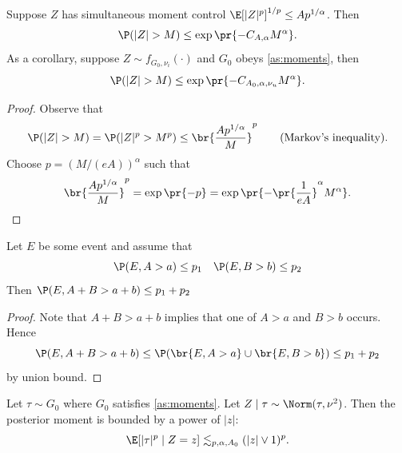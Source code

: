 \documentclass[12pt, reqno]{amsart}
\numberwithin{equation}{section}
\begin{document}
\begin{refsection}
\begin{appendices}
\begin{lemma}
\label{lemma:tail_bound}
Suppose $Z$ has simultaneous moment control $\E[|Z|^p]^{1/p} \le A p^{1/\alpha}$. Then \[
\P(|Z| > M) \le \exp\pr{-C_{A,\alpha} M^\alpha}.
\]
As a corollary, suppose $ Z \sim f_{G_0, \nu_i}(\cdot)$ and $G_0$ obeys \cref{as:moments},
then \[\P(|Z| > M) \le \exp\pr{-C_{A_0, \alpha, \nu_u} M^\alpha}.\]
\end{lemma}
\begin{proof}
Observe that
\begin{align*}
\P(|Z| > M) = \P(|Z|^p > M^p) \le \br{\frac{Ap^{1/\alpha}}{M}}^p \tag{Markov's
inequality}.
\end{align*}
Choose $p = (M/(eA))^{\alpha}$ such that \[
\br{\frac{Ap^{1/\alpha}}{M}}^p = \exp\pr{-p} = \exp\pr{- \pr{\frac{1}{eA}}^{\alpha} M^
{\alpha}}. \qedhere
\]
\end{proof}

\begin{lemma}
\label{lemma:union_bound}
Let $E$ be some event and assume that \[
\P(E, A > a) \le p_1 \quad \P(E, B>b) \le p_2
\]
Then $\P(E, A+B>a+b) \le p_1 + p_2$
\end{lemma}
\begin{proof}
Note that $A+B > a+b$ implies that one of $A>a$ and $B>b$ occurs. Hence \[
\P(E, A+B>a+b) \le \P(\br{E, A>a} \cup \br{E, B>b}) \le p_1 + p_2
\]
by union bound.
\end{proof}


\begin{lemma}
\label{lemma:posterior_moments}
    Let $\tau \sim G_0$ where $G_0$ satisfies \cref{as:moments}. Let $Z
    \mid \tau \sim \Norm(\tau, \nu^2)$. Then the posterior moment is
    bounded by a power of $|z|$: \[
    \E[|\tau|^p \mid Z=z] \lesssim_{p,\alpha, A_0} (|z| \vee 1)^p.
    \]

\end{lemma}


\end{appendices}
\end{refsection}
\end{document}
